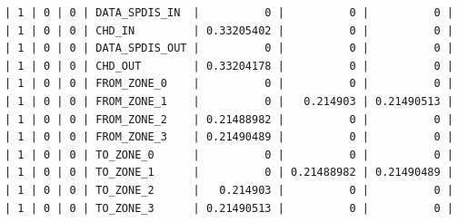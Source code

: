 \documentclass[titlepage,12pt]{unisubmission}
\begin{document}
\begin{verbatim}
| 1 | 0 | 0 | DATA_SPDIS_IN  |          0 |          0 |          0 |
| 1 | 0 | 0 | CHD_IN         | 0.33205402 |          0 |          0 |
| 1 | 0 | 0 | DATA_SPDIS_OUT |          0 |          0 |          0 |
| 1 | 0 | 0 | CHD_OUT        | 0.33204178 |          0 |          0 |
| 1 | 0 | 0 | FROM_ZONE_0    |          0 |          0 |          0 |
| 1 | 0 | 0 | FROM_ZONE_1    |          0 |   0.214903 | 0.21490513 |
| 1 | 0 | 0 | FROM_ZONE_2    | 0.21488982 |          0 |          0 |
| 1 | 0 | 0 | FROM_ZONE_3    | 0.21490489 |          0 |          0 |
| 1 | 0 | 0 | TO_ZONE_0      |          0 |          0 |          0 |
| 1 | 0 | 0 | TO_ZONE_1      |          0 | 0.21488982 | 0.21490489 |
| 1 | 0 | 0 | TO_ZONE_2      |   0.214903 |          0 |          0 |
| 1 | 0 | 0 | TO_ZONE_3      | 0.21490513 |          0 |          0 |
\end{verbatim}
\end{document}

